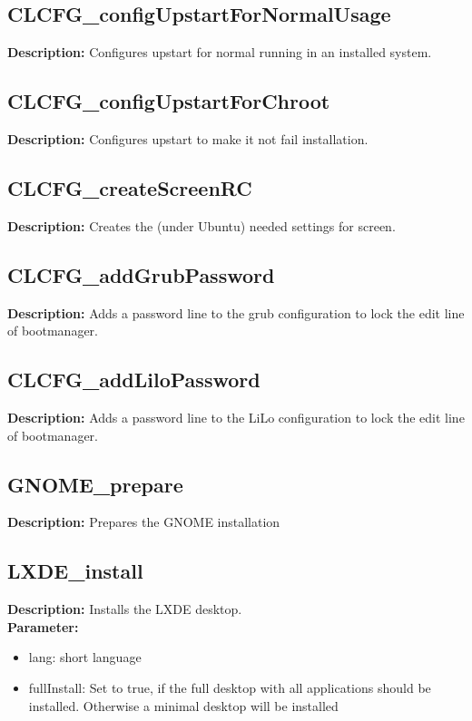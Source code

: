 \subsection{CLCFG\_configUpstartForNormalUsage}
\textbf{Description:} Configures upstart for normal running in an installed system.\\

\subsection{CLCFG\_configUpstartForChroot}
\textbf{Description:} Configures upstart to make it not fail installation.\\

\subsection{CLCFG\_createScreenRC}
\textbf{Description:} Creates the (under Ubuntu) needed settings for screen.\\

\subsection{CLCFG\_addGrubPassword}
\textbf{Description:} Adds a password line to the grub configuration to lock the edit line of bootmanager.\\

\subsection{CLCFG\_addLiloPassword}
\textbf{Description:} Adds a password line to the LiLo configuration to lock the edit line of bootmanager.\\

\subsection{GNOME\_prepare}
\textbf{Description:} Prepares the GNOME installation\\

\subsection{LXDE\_install}
\textbf{Description:} Installs the LXDE desktop.\\
\textbf{Parameter:}
\begin{itemize}
\item lang: short language
\item fullInstall: Set to true, if the full desktop with all applications should be installed. Otherwise a minimal desktop will be installed
\end{itemize}

